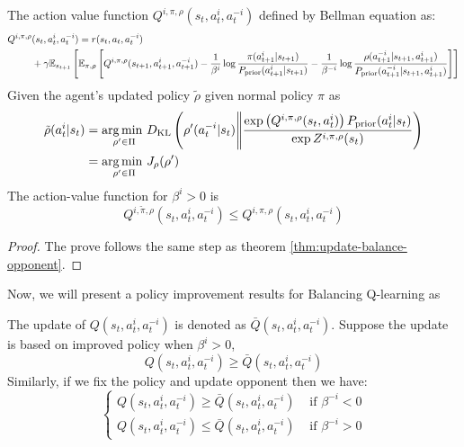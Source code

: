 \begin{theorem}
\label{thm:update-balance-agent}
    The action value function $Q^{i, \pi, \rho}(s_t, a^i_t, a^{-i}_t)$ defined by Bellman equation as:
    \begin{equation}
    \begin{aligned}
        Q^{i, \pi, \rho}&(s_t, a^i_t, a^{-i}_t) = r(s_t, a_t, a^{-i}_t) \\
        &+ \gamma\mathbb{E}_{s_{t+1}}\left[ \mathbb{E}_{\pi, \rho}\left[ Q^{i, \pi, \rho}(s_{t+1}, a^i_{t+1}, a^{-i}_{t+1}) - \frac{1}{\beta^i} \log\frac{\pi(a^i_{t+1}|s_{t+1})}{P_{\text{prior}}(a^i_{t+1}|s_{t+1})} - \frac{1}{\beta^{-i}}\log \frac{\rho(a^{-i}_{t+1}|s_{t+1}, a^i_{t+1})}{P_{\text{prior}}(a^{-i}_{t+1}|s_{t+1}, a^i_{t+1})} \right] \right]
    \end{aligned}
    \end{equation}
    Given the agent's updated policy $\tilde{\rho}$ given normal policy $\pi$ as 
    \begin{equation}
    \begin{aligned}
        \tilde{\rho}(a^{i}_t | s_t) &= \underset{\rho' \in \Pi}{\arg\min \ } D_{\mathrm{KL}} \left(  \rho'(a^{-i}_t | s_t) \Bigg\| \frac{\exp\left( Q^{i, \pi, \rho}(s_t, a^{i}_t) \right) P_{\text{prior}}(a^{i}_t | s_t)}{\exp Z^{i, \pi, \rho}(s_t)} \right) \\
        &=\underset{\rho' \in \Pi}{\arg\min \ } J_{\rho}(\rho')
    \end{aligned}
    \end{equation}
    The action-value function for $\beta^i > 0$ is 
    \begin{equation}
    Q^{i, \tilde{\pi}, \rho}(s_t, a^i_t, a^{-i}_t) \le Q^{i, \pi, \rho}(s_t, a^i_t, a^{-i}_t)
    \end{equation}
\end{theorem}
\begin{proof}
The prove follows the same step as theorem \ref{thm:update-balance-opponent}.
\end{proof}
Now, we will present a policy improvement results for Balancing Q-learning as 
\begin{corollary}
    The update of $Q(s_t, a^i_t, a^{-i}_t)$ is denoted as $\bar{Q}(s_t, a^i_t, a^{-i}_t)$. Suppose the update is based on improved policy when $\beta^i > 0$, 
    \begin{equation}
        Q(s_t, a^i_t, a^{-i}_t) \ge \bar{Q}(s_t, a^i_t, a^{-i}_t)
    \end{equation}
    Similarly, if we fix the policy and update opponent then we have:
    \begin{equation}
    \begin{cases}
        Q(s_t, a^i_t, a^{-i}_t) \ge \bar{Q}(s_t, a^i_t, a^{-i}_t) &\text{ if } \beta^{-i} < 0 \\
        Q(s_t, a^i_t, a^{-i}_t) \le \bar{Q}(s_t, a^i_t, a^{-i}_t)&\text{ if } \beta^{-i} > 0
    \end{cases}
    \end{equation}
\end{corollary}
